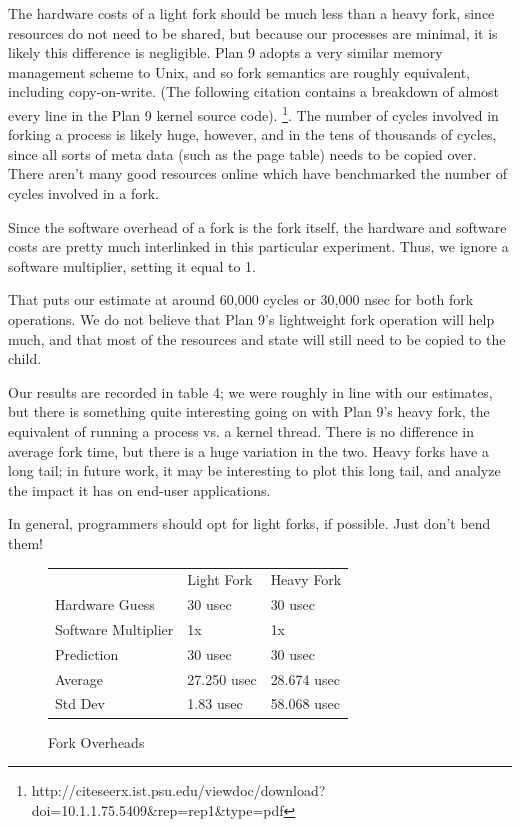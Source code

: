 \documentclass[letterpaper,twocolumn,10pt]{article}
\begin{document}
The hardware costs of a light fork should be much less than a heavy fork, since
resources do not need to be shared, but because our processes are minimal, it
is likely this difference is negligible. Plan 9 adopts a very similar memory management
scheme to Unix, and so fork semantics are roughly equivalent, including copy-on-write. (The 
following citation contains a breakdown of almost every line in the Plan 9 kernel source code).
\footnote{http://citeseerx.ist.psu.edu/viewdoc/download? doi=10.1.1.75.5409\&rep=rep1\&type=pdf}. The number
of cycles involved in forking a process is likely huge, however, and in the tens of thousands of 
cycles, since all sorts of meta data (such as the page table) needs to be copied over. There 
aren't many good resources online which have benchmarked the number of cycles involved in a fork.

Since the software overhead of a fork is the fork itself, the hardware and software costs are 
pretty much interlinked in this particular experiment. Thus, we ignore a software multiplier, setting it
equal to 1. 

That puts our estimate at around 60,000 cycles or 30,000 nsec for both fork operations. We do not 
believe that Plan 9's lightweight fork operation will help much, and that most of the resources 
and state will still need to be copied to the child.

Our results are recorded in table 4; we were roughly in line with our estimates, but there is something quite interesting going on with Plan 9's heavy fork, the equivalent of running a process vs. a kernel thread. There is no difference in average fork time, but there is a huge variation in the two. Heavy forks have a long tail; in future work, it may be interesting to plot this long tail, and analyze the impact it has on end-user applications.

In general, programmers should opt for light forks, if possible. Just don't bend them!

\begin{figure}
	\centering
\begin{tabular}{lll}
        & Light Fork & Heavy Fork \\
Hardware Guess & 30 usec & 30 usec \\
Software Multiplier & 1x & 1x \\
Prediction & 30 usec & 30 usec \\
Average & 27.250  usec & 28.674  usec \\
Std Dev & 1.83 usec & 58.068 usec                  
\end{tabular}
\caption{Fork Overheads}
\label{tab:forkoverheads}
\end{figure}
\end{document}
